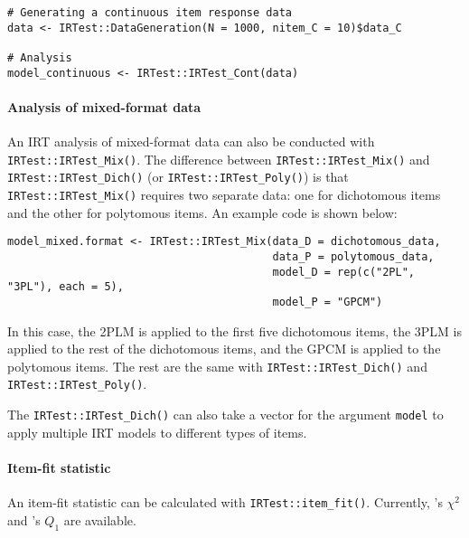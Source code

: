 \begin{verbatim}
# Generating a continuous item response data
data <- IRTest::DataGeneration(N = 1000, nitem_C = 10)$data_C

# Analysis
model_continuous <- IRTest::IRTest_Cont(data)
\end{verbatim}

\hypertarget{analysis-of-mixed-format-data}{%
\paragraph*{Analysis of mixed-format data}\label{analysis-of-mixed-format-data}}

An IRT analysis of mixed-format data can also be conducted with
\texttt{IRTest::IRTest\_Mix()}. The difference between \texttt{IRTest::IRTest\_Mix()} and
\texttt{IRTest::IRTest\_Dich()} (or \texttt{IRTest::IRTest\_Poly()}) is that
\texttt{IRTest::IRTest\_Mix()} requires two separate data: one for dichotomous items
and the other for polytomous items. An example code is shown below:

\begin{verbatim}
model_mixed.format <- IRTest::IRTest_Mix(data_D = dichotomous_data,
                                         data_P = polytomous_data,
                                         model_D = rep(c("2PL", "3PL"), each = 5),
                                         model_P = "GPCM")
\end{verbatim}

In this case, the 2PLM is applied to the first five dichotomous items,
the 3PLM is applied to the rest of the dichotomous items, and the GPCM
is applied to the polytomous items. The rest are the same with
\texttt{IRTest::IRTest\_Dich()} and \texttt{IRTest::IRTest\_Poly()}.

The \texttt{IRTest::IRTest\_Dich()} can also take a vector for the argument \texttt{model} to
apply multiple IRT models to different types of items.

\hypertarget{item-fit-statistic}{%
\paragraph*{Item-fit statistic}\label{item-fit-statistic}}

An item-fit statistic can be calculated with \texttt{IRTest::item\_fit()}. Currently,
\citet{Bock:1960}'s \(\chi^{2}\) and \citet{Yen:1981}'s \(Q_{1}\) are available.



\address{%
Seewoo Li\\
University of California, Los Angeles\\%
Social Research Methodology, Department of Education\\
%
%
\textit{ORCiD: \href{https://orcid.org/0000-0002-6290-2777}{0000-0002-6290-2777}}\\%
\href{mailto:seewooli@g.ucla.edu}{\nolinkurl{seewooli@g.ucla.edu}}%
}
